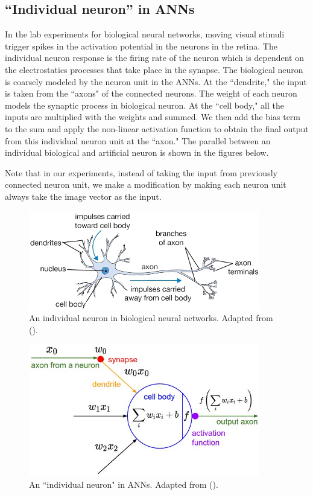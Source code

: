  \subsection{``Individual neuron'' in ANNs}
 In the lab experiments for biological neural networks, moving visual stimuli trigger spikes in the activation potential in the neurons in the retina. The individual neuron response is the firing rate of the neuron which is dependent on the  electrostatics processes that take place in the synapse. The biological neuron is coarsely modeled by the neuron unit in the ANNs. At the ``dendrite," the input is taken from the ``axons" of the connected neurons. The weight of each neuron models the synaptic process in biological neuron. At the ``cell body," all the inputs are multiplied with the weights and summed. We then add the bias term to the sum and apply the non-linear activation function to obtain the final output from this individual neuron unit at the ``axon." The parallel between an individual biological and artificial neuron is shown in the figures below. 
 
 Note that in our experiments, instead of taking the input from previously connected neuron unit, we make a modification by making each neuron unit always take the image vector as the input.
 
  \begin{figure}[H]
        \centering
            \includegraphics[width=0.9\textwidth]{figures/artificial/neuron.png}
            \caption{An individual neuron in biological neural networks. Adapted from (\cite{cs231n}).}
    \end{figure}
     \begin{figure}[H]
        \centering
            \includegraphics[width=0.9\textwidth]{figures/artificial/neuron_model.jpeg}
            \caption{An ``individual neuron" in ANNs. Adapted from (\cite{cs231n}).}
    \end{figure}
    
